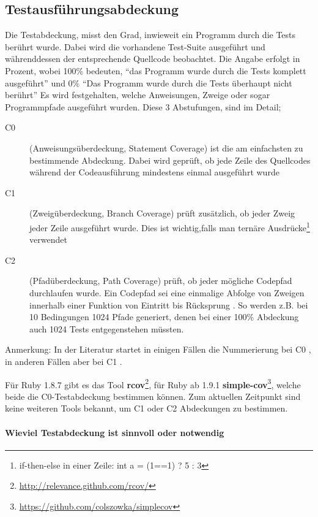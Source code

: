 \subsection{Testausführungsabdeckung}
Die Testabdeckung, misst den Grad, inwieweit ein Programm durch die Tests berührt wurde. Dabei wird die vorhandene Test-Suite ausgeführt und währenddessen der entsprechende Quellcode beobachtet. Die Angabe erfolgt in Prozent, wobei 100\% bedeuten, "`das Programm wurde durch die Tests komplett ausgeführt"' und 0\% "`Das Programm wurde durch die Tests überhaupt nicht berührt"'  Es wird festgehalten, welche Anweisungen, Zweige oder sogar Programmpfade ausgeführt wurden. Diese 3 Abstufungen, sind im Detail;
\begin{description}
 \item[C0] (Anweisungsüberdeckung, Statement Coverage) ist die am einfachsten zu bestimmende Abdeckung. Dabei wird geprüft, ob jede Zeile des Quellcodes während der Codeausführung mindestens einmal ausgeführt wurde
 \item[C1] (Zweigüberdeckung, Branch Coverage) prüft zusätzlich, ob jeder Zweig jeder Zeile ausgeführt wurde. Dies ist wichtig,falls man ternäre Ausdrücke\footnote{if-then-else in einer Zeile: int a = (1==1) ? 5 : 3} verwendet
 \item[C2] (Pfadüberdeckung, Path Coverage) prüft, ob jeder mögliche Codepfad durchlaufen wurde. Ein Codepfad sei eine einmalige Abfolge von Zweigen innerhalb einer Funktion von Eintritt bis Rücksprung \citep{steve_cornett_code_1996}. So werden z.B. bei 10 Bedingungen 1024 Pfade generiert, denen bei einer 100\% Abdeckung auch 1024 Tests entgegenstehen müssten.
 \end{description}
 Anmerkung: In der Literatur startet in einigen Fällen die Nummerierung bei C0 \citep{catherine_powell_abakas_2008}, in anderen Fällen aber bei C1 \citep{steve_cornett_code_1996}.

 Für Ruby 1.8.7 gibt es das Tool \textbf{rcov}\footnote{\url{http://relevance.github.com/rcov/}}, für Ruby ab 1.9.1 \textbf{simple-cov}\footnote{\url{https://github.com/colszowka/simplecov}}, welche beide die C0-Testabdeckung bestimmen können. Zum aktuellen Zeitpunkt sind keine weiteren Tools bekannt, um C1 oder C2 Abdeckungen zu bestimmen.
 \paragraph{Wieviel Testabdeckung ist sinnvoll oder notwendig}

